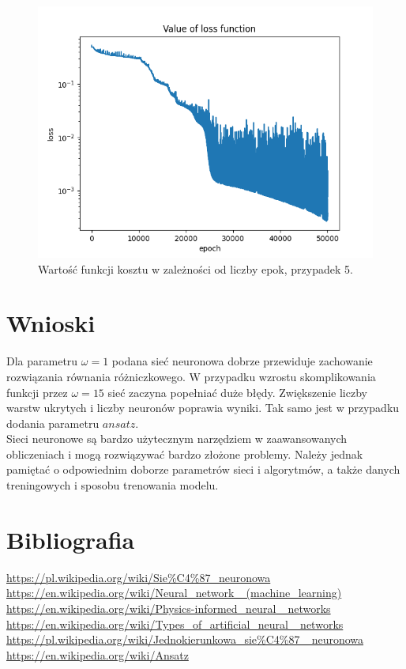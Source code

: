 \documentclass[11pt, leqno]{scrartcl}
\begin{document}
    \begin{figure}[H]
        \centering
        \includegraphics[width=0.7\linewidth]{nn_c_loss.png}
        \caption{Wartość funkcji kosztu w zależności od liczby epok,
            przypadek 5.}
    \end{figure}

    \section{Wnioski}
    Dla parametru $\omega =1$ podana sieć neuronowa dobrze
    przewiduje zachowanie rozwiązania równania różniczkowego.
    W przypadku wzrostu skomplikowania funkcji przez $\omega =15$
    sieć zaczyna popełniać duże błędy. Zwiększenie liczby warstw
    ukrytych i liczby neuronów poprawia wyniki. Tak samo jest
    w przypadku dodania parametru $ansatz$. \\
    Sieci neuronowe są bardzo użytecznym narzędziem w zaawansowanych
    obliczeniach i mogą rozwiązywać bardzo złożone problemy. Należy
    jednak pamiętać o odpowiednim doborze parametrów sieci
    i algorytmów, a także danych treningowych i sposobu trenowania
    modelu.

    \section{Bibliografia}
    \url{https://pl.wikipedia.org/wiki/Sie%C4%87_neuronowa} \\
    \url{https://en.wikipedia.org/wiki/Neural_network_
        (machine_learning)} \\
    \url{https://en.wikipedia.org/wiki/Physics-informed_neural_
        networks} \\
    \url{https://en.wikipedia.org/wiki/Types_of_artificial_neural_
        networks} \\
    \url{https://pl.wikipedia.org/wiki/Jednokierunkowa_sie\%C4\%87_
        neuronowa} \\
    \url{https://en.wikipedia.org/wiki/Ansatz}
\end{document}
